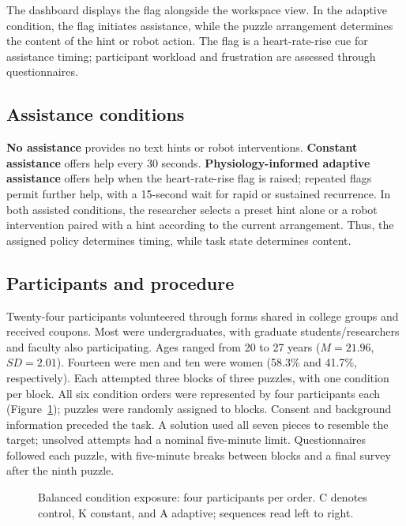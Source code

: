 \documentclass[sigconf,anonymous]{aamas}
\begin{document}
The dashboard displays the flag alongside the workspace view. In the adaptive condition, the flag initiates assistance, while the puzzle arrangement determines the content of the hint or robot action. The flag is a heart-rate-rise cue for assistance timing; participant workload and frustration are assessed through questionnaires.

\subsection{Assistance conditions}

\textbf{No assistance} provides no text hints or robot interventions. \textbf{Constant assistance} offers help every 30 seconds. \textbf{Physiology-informed adaptive assistance} offers help when the heart-rate-rise flag is raised; repeated flags permit further help, with a 15-second wait for rapid or sustained recurrence. In both assisted conditions, the researcher selects a preset hint alone or a robot intervention paired with a hint according to the current arrangement. Thus, the assigned policy determines timing, while task state determines content.

\subsection{Participants and procedure}

Twenty-four participants volunteered through forms shared in college groups and received coupons. Most were undergraduates, with graduate students/researchers and faculty also participating. Ages ranged from 20 to 27 years ($M=21.96$, $SD=2.01$). Fourteen were men and ten were women (58.3\% and 41.7\%, respectively). Each attempted three blocks of three puzzles, with one condition per block. All six condition orders were represented by four participants each (Figure~\ref{fig:order}); puzzles were randomly assigned to blocks. Consent and background information preceded the task. A solution used all seven pieces to resemble the target; unsolved attempts had a nominal five-minute limit. Questionnaires followed each puzzle, with five-minute breaks between blocks and a final survey after the ninth puzzle.

\begin{figure}[!htbp]
\centering
\begingroup
\fontsize{12}{13}\selectfont
\renewcommand{\small}{\fontsize{11}{12}\selectfont}
\resizebox{\columnwidth}{!}{}
\endgroup
\caption{Balanced condition exposure: four participants per order. C denotes control, K constant, and A adaptive; sequences read left to right.}
\label{fig:order}
\end{figure}
\end{document}
